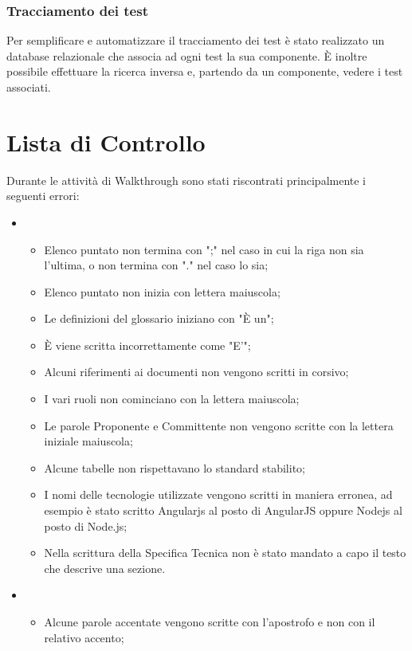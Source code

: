 \subsubsection{Tracciamento dei test}
\label{}
Per semplificare e automatizzare il tracciamento dei test è stato realizzato un database relazionale che associa ad ogni test la sua componente. È inoltre possibile effettuare la ricerca inversa e, partendo da un componente, vedere i test associati.

\appendix
\section{Lista di Controllo}
\label{}
Durante le attività di Walkthrough sono stati riscontrati principalmente i seguenti errori:\\
\begin{itemize}
\item {}
\begin{itemize}
\item Elenco puntato non termina con ";" nel caso in cui la riga non sia l'ultima, o non termina con "." nel caso lo sia;
\item Elenco puntato non inizia con lettera maiuscola;
\item Le definizioni del glossario iniziano con "È un";
\item È viene scritta incorrettamente come "E'";
\item Alcuni riferimenti ai documenti non vengono scritti in corsivo;
\item I vari ruoli non cominciano con la lettera maiuscola;
\item Le parole Proponente e Committente non vengono scritte con la lettera iniziale maiuscola;
\item Alcune tabelle non rispettavano lo standard stabilito;
\item I nomi delle tecnologie utilizzate vengono scritti in maniera erronea, ad esempio è stato scritto Angularjs al posto di AngularJS oppure Nodejs al posto di Node.js;
\item Nella scrittura della Specifica Tecnica non è stato mandato a capo il testo che descrive una sezione.\\
\end{itemize}
\item {}
\begin{itemize}
\item Alcune parole accentate vengono scritte con l'apostrofo e non con il relativo accento;

\end{itemize}
\end{itemize}
